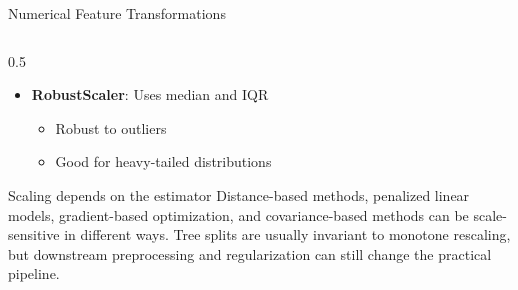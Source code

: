\documentclass[aspectratio=169,11pt]{beamer}
\begin{document}
\begin{frame}[fragile]{Numerical Feature Transformations}
\begin{columns}
\begin{column}{0.5\textwidth}
\begin{itemize}
\item \textbf{RobustScaler}: Uses median and IQR
  \begin{itemize}
  \item Robust to outliers
  \item Good for heavy-tailed distributions
  \end{itemize}
\end{itemize}

\begin{alertblock}{Scaling depends on the estimator}
Distance-based methods, penalized linear models, gradient-based optimization, and covariance-based methods can be scale-sensitive in different ways. Tree splits are usually invariant to monotone rescaling, but downstream preprocessing and regularization can still change the practical pipeline.
\end{alertblock}
\end{column}
\end{columns}
\end{frame}
\end{document}
